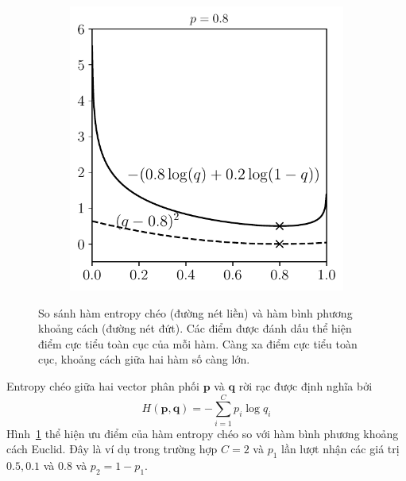 \begin{figure}[t]
\begin{subfigure}{0.325\textwidth}
\caption{}
\end{subfigure}
\begin{subfigure}{0.325\textwidth}
\includegraphics[width=0.99\linewidth]{Chapters/05_NeuralNetworks/13_softmax/crossentropy3.pdf}
\caption{}
\end{subfigure}

\caption{
So sánh hàm entropy chéo (đường nét liền) và hàm bình phương khoảng cách
(đường nét đứt). Các điểm được đánh dấu thể hiện điểm cực tiểu toàn cục
của mỗi hàm. Càng xa điểm cực tiểu toàn cục, khoảng cách giữa hai hàm số
càng lớn. }
\label{fig:13_4}
\end{figure}
Entropy chéo giữa hai vector phân phối $\mathbf{p}$ và $\mathbf{q}$ rời rạc
được định nghĩa bởi
\begin{equation}
\label{eqn:13_1}
H(\mathbf{p}, \mathbf{q}) =-\sum_{i=1}^C p_i \log q_i
\end{equation}
Hình~\ref{fig:13_4} thể hiện ưu điểm của hàm entropy chéo so với hàm bình
phương khoảng cách Euclid. Đây là ví dụ trong trường hợp $C = 2$ và $p_1$ lần
lượt nhận các giá trị $0.5, 0.1$ và $0.8$ và $p_2 = 1 - p_1$.
